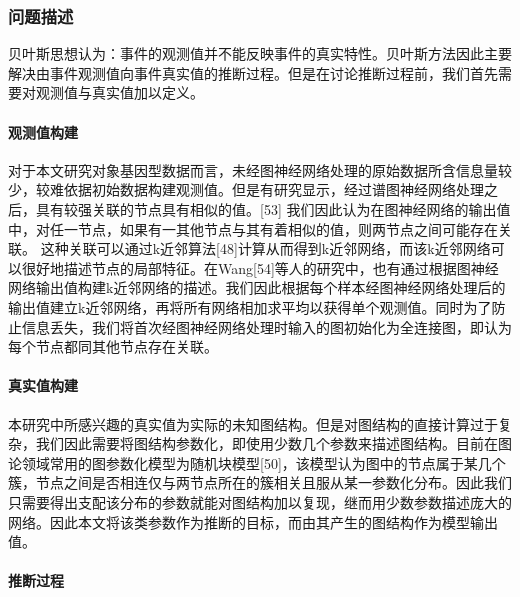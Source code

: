 \documentclass[
]{article}
\begin{document}
\hypertarget{ux95eeux9898ux63cfux8ff0}{%
\subsubsection{问题描述}\label{ux95eeux9898ux63cfux8ff0}}

贝叶斯思想认为：事件的观测值并不能反映事件的真实特性。贝叶斯方法因此主要解决由事件观测值向事件真实值的推断过程。但是在讨论推断过程前，我们首先需要对观测值与真实值加以定义。

\hypertarget{ux89c2ux6d4bux503cux6784ux5efa}{%
\paragraph{观测值构建}\label{ux89c2ux6d4bux503cux6784ux5efa}}

对于本文研究对象基因型数据而言，未经图神经网络处理的原始数据所含信息量较少，较难依据初始数据构建观测值。但是有研究显示，经过谱图神经网络处理之后，具有较强关联的节点具有相似的值。{[}53{]}
我们因此认为在图神经网络的输出值中，对任一节点，如果有一其他节点与其有着相似的值，则两节点之间可能存在关联。
这种关联可以通过k近邻算法{[}48{]}计算从而得到k近邻网络，而该k近邻网络可以很好地描述节点的局部特征。在Wang{[}54{]}等人的研究中，也有通过根据图神经网络输出值构建k近邻网络的描述。我们因此根据每个样本经图神经网络处理后的输出值建立k近邻网络，再将所有网络相加求平均以获得单个观测值。同时为了防止信息丢失，我们将首次经图神经网络处理时输入的图初始化为全连接图，即认为每个节点都同其他节点存在关联。

\hypertarget{ux771fux5b9eux503cux6784ux5efa}{%
\paragraph{真实值构建}\label{ux771fux5b9eux503cux6784ux5efa}}

本研究中所感兴趣的真实值为实际的未知图结构。但是对图结构的直接计算过于复杂，我们因此需要将图结构参数化，即使用少数几个参数来描述图结构。目前在图论领域常用的图参数化模型为随机块模型{[}50{]}，该模型认为图中的节点属于某几个簇，节点之间是否相连仅与两节点所在的簇相关且服从某一参数化分布。因此我们只需要得出支配该分布的参数就能对图结构加以复现，继而用少数参数描述庞大的网络。因此本文将该类参数作为推断的目标，而由其产生的图结构作为模型输出值。

\hypertarget{ux63a8ux65adux8fc7ux7a0b}{%
\paragraph{推断过程}\label{ux63a8ux65adux8fc7ux7a0b}}
\end{document}
